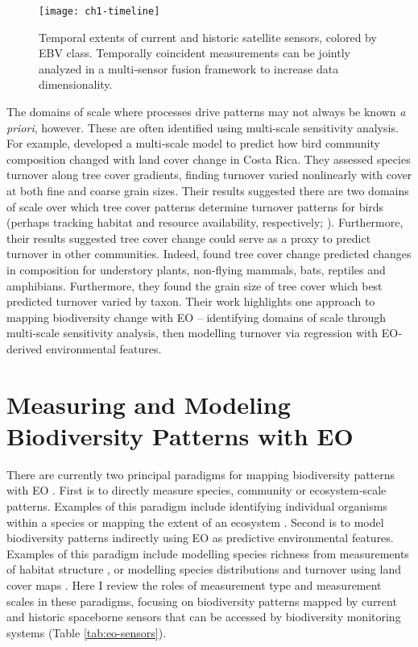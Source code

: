 \begin{figure}[!ht]
\texttt{[image: ch1-timeline]}
\centering
\caption[Temporal extents of current and historic satellite sensors.]{Temporal extents of current and historic satellite sensors, colored by EBV class. Temporally coincident measurements can be jointly analyzed in a multi‐sensor fusion framework to increase data dimensionality.}
\label{fig:timeline}
\end{figure}

The domains of scale where processes drive patterns may not always be known \textit{a priori}, however. These are often identified using multi‐scale sensitivity analysis. For example, \cite{Mendenhall2011-mu} developed a multi‐scale model to predict how bird community composition changed with land cover change in Costa Rica. They assessed species turnover along tree cover gradients, finding turnover varied nonlinearly with cover at both fine and coarse grain sizes. Their results suggested there are two domains of scale over which tree cover patterns determine turnover patterns for birds (perhaps tracking habitat and resource availability, respectively; \cite{morrison2012wildlife}). Furthermore, their results suggested tree cover change could serve as a proxy to predict turnover in other communities. Indeed, \cite{Mendenhall2016-xz} found tree cover change predicted changes in composition for understory plants, non‐flying mammals, bats, reptiles and amphibians. Furthermore, they found the grain size of tree cover which best predicted turnover varied by taxon. Their work highlights one approach to mapping biodiversity change with EO – identifying domains of scale through multi‐scale sensitivity analysis, then modelling turnover via regression with EO‐derived environmental features.

\section{Measuring and Modeling Biodiversity Patterns with EO}

There are currently two principal paradigms for mapping biodiversity patterns with EO \cite{Turner2003-dp}. First is to directly measure species, community or ecosystem‐scale patterns. Examples of this paradigm include identifying individual organisms within a species \cite{Gairola2013-fk} or mapping the extent of an ecosystem \cite{Henderson2008-xd}. Second is to model biodiversity patterns indirectly using EO as predictive environmental features. Examples of this paradigm include modelling species richness from measurements of habitat structure \cite{Saatchi2008-jq}, or modelling species distributions and turnover using land cover maps \cite{Guisan2005-kg, Keil2012-ad}. Here I review the roles of measurement type and measurement scales in these paradigms, focusing on biodiversity patterns mapped by current and historic spaceborne sensors that can be accessed by biodiversity monitoring systems (Table \ref{tab:eo-sensors}).

